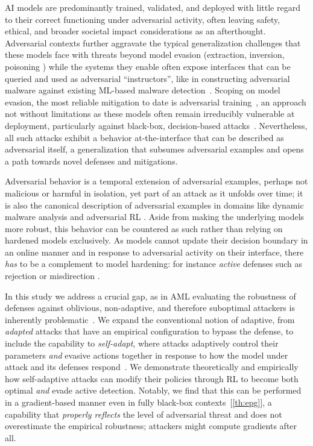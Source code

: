 AI models are predominantly trained, validated, and deployed with little regard to their correct functioning under adversarial activity, often leaving safety, ethical, and broader societal impact considerations as an afterthought.
Adversarial contexts further aggravate the typical generalization challenges that these models face with threats beyond model evasion (extraction, inversion, poisoning \cite{he2020towards}) while the systems they enable often expose interfaces that can be queried and used as adversarial ``instructors'', like in constructing adversarial malware against existing ML-based malware detection~\cite{anderson2018learning, demetrio2021functionality}.
Scoping on model evasion, the most reliable mitigation to date is adversarial training~\cite{madry2017towards, wang2019convergence}, an approach not without limitations as these models often remain irreducibly vulnerable at deployment, particularly against black-box, decision-based attacks~\cite{brendel2018decision, chen2020hopskipjumpattack, yan2020policy}.
Nevertheless, all such attacks exhibit a behavior at-the-interface that can be described as adversarial itself, a generalization that subsumes adversarial examples and opens a path towards novel defenses and mitigations.

Adversarial behavior is a temporal extension of adversarial examples, perhaps not malicious or harmful in isolation, yet part of an attack as it unfolds over time; it is also the canonical description of adversarial examples in domains like dynamic malware analysis and adversarial RL \cite{tsingenopoulos2022adaptive, gleave2020adversarial}.
Aside from making the underlying models more robust, this behavior can be countered as such rather than relying on hardened models exclusively.
As models cannot update their decision boundary in an online manner and in response to adversarial activity on their interface, there \emph{has} to be a complement to model hardening: for instance \emph{active} defenses such as rejection or misdirection \cite{barbero2022transcending, sengupta2020multi, chen2020stateful}.

In this study we address a crucial gap, as in \gls{AML} evaluating the robustness of defenses against oblivious, non-adaptive, and therefore suboptimal attackers is inherently problematic~\cite{tramer2020adaptive,croce2020reliable}.
We expand the conventional notion of adaptive, from \emph{adapted} attacks that have an empirical configuration to bypass the defense, to include the capability to \emph{self-adapt}, where attacks adaptively control their parameters \textit{and} evasive actions together in response to how the model under attack and its defenses respond~\cite{aastrom2013adaptive}.
We demonstrate theoretically and empirically how self-adaptive attacks can modify their policies through \gls{RL} to become both optimal \emph{and} evade active detection.
Notably, we find that this can be performed in a gradient-based manner even in fully black-box contexts~[\ref{th:epg}], a capability that \emph{properly reflects} the level of adversarial threat and does not overestimate the empirical robustness; attackers might compute gradients after all.

